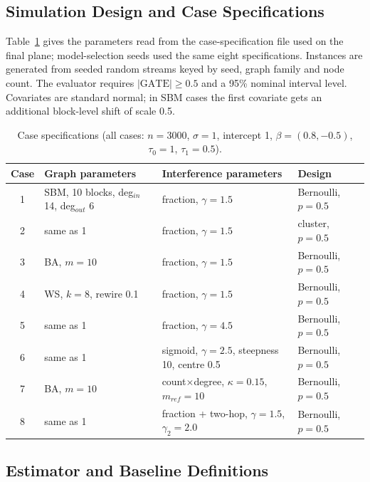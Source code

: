 \documentclass{article}
\newcommand{\gate}{\mathrm{GATE}}
\begin{document}
\subsection{Simulation Design and Case Specifications}
Table~\ref{tab:spec} gives the parameters read from the case-specification file used on the final plane; model-selection seeds used the same eight specifications. Instances are generated from seeded random streams keyed by seed, graph family and node count. The evaluator requires $|\gate|\ge0.5$ and a 95\% nominal interval level. Covariates are standard normal; in SBM cases the first covariate gets an additional block-level shift of scale 0.5.
\begin{table}[h]
\centering\small
\setlength{\tabcolsep}{4pt}\footnotesize
\caption{Case specifications (all cases: $n=3000$, $\sigma=1$, intercept 1, $\beta=(0.8,-0.5)$, $\tau_0=1$, $\tau_1=0.5$).}
\label{tab:spec}
\begin{tabular}{clll}
\toprule
Case & Graph parameters & Interference parameters & Design\\
\midrule
1 & SBM, 10 blocks, deg$_{in}$ 14, deg$_{out}$ 6 & fraction, $\gamma=1.5$ & Bernoulli, $p=0.5$\\
2 & same as 1 & fraction, $\gamma=1.5$ & cluster, $p=0.5$\\
3 & BA, $m=10$ & fraction, $\gamma=1.5$ & Bernoulli, $p=0.5$\\
4 & WS, $k=8$, rewire 0.1 & fraction, $\gamma=1.5$ & Bernoulli, $p=0.5$\\
5 & same as 1 & fraction, $\gamma=4.5$ & Bernoulli, $p=0.5$\\
6 & same as 1 & sigmoid, $\gamma=2.5$, steepness 10, centre 0.5 & Bernoulli, $p=0.5$\\
7 & BA, $m=10$ & count$\times$degree, $\kappa=0.15$, $m_{ref}=10$ & Bernoulli, $p=0.5$\\
8 & same as 1 & fraction + two-hop, $\gamma=1.5$, $\gamma_2=2.0$ & Bernoulli, $p=0.5$\\
\bottomrule
\end{tabular}
\end{table}

\subsection{Estimator and Baseline Definitions}
\end{document}
